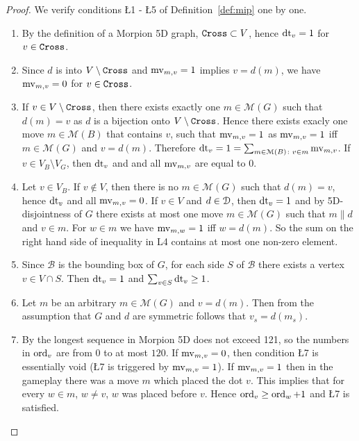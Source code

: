 \begin{proof}
  We verify conditions \L{1} - \L{5} of Definition~\ref{def:mip} one by one.
    
  \begin{enumerate}[label=\L{\arabic*}.]
   \item  By the definition of a Morpion 5D graph, $\texttt{Cross} \subset V$, hence $\operatorname{dt}_v = 1$ for $v \in \texttt{Cross}$.
  \item Since $d$ is into $V \setminus \texttt{Cross}$ and $\operatorname{mv}_{m, v} = 1$ implies $v = d(m)$, we have
    $\operatorname{mv}_{m, v} = 0$ for $v \in \texttt{Cross}$.
  \item If $v \in V \setminus \texttt{Cross}$, then there exists exactly one $m \in \mathcal{M}(G)$ such that $d(m) = v$
     as $d$ is a bijection onto $V \setminus \texttt{Cross}$.
   Hence  there exists exacly one move $m \in \mathcal{M}(B)$ that contains $v$,
     such that $\operatorname{mv}_{m, v} = 1$ as $\operatorname{mv}_{m,v} = 1$ iff $m \in \mathcal{M}(G)$ and $v = d(m)$.
   Therefore $\operatorname{dt}_v = 1 = \sum_{m \in \mathcal{M}(B) \colon v \in m} \operatorname{mv}_{m,v}$.
  If $v \in V_B \setminus V_G$, then $\operatorname{dt}_v$ and and all $\operatorname{mv}_{m, v}$ are equal to $0$. 
  \item Let $v \in V_B$. If $v \not\in V$, then there is no $m \in \mathcal{M}(G)$ such that
     $d(m) = v$, hence $\operatorname{dt}_v$ and all $\operatorname{mv}_{m,v} = 0$.
     If $v \in V$ and $d \in \mathcal{D}$, then $\operatorname{dt}_v = 1$ and by 5D-disjointness of $G$ there exists
    at most one move 
    $m \in \mathcal{M}(G)$ such that $m \parallel d$ and $v \in m$. 
    For $w \in m$ we have $\operatorname{mv}_{m, w} = 1$ iff $w = d(m)$.
    So the sum on the right hand side of inequality in L4 contains at most one non-zero element.
  \item Since $\mathcal{B}$ is the bounding box of $G$, for each side $S$ of $\mathcal{B}$ there
    exists a vertex $v \in V \cap S$. Then $\operatorname{dt}_v = 1$ and $\sum_{v \in S} \operatorname{dt}_v \geq 1$.  
  \item Let $m$ be an arbitrary $m\in \mathcal{M}(G)$ and $v=d(m)$. Then from the assumption that $G$ and $d$ are symmetric follows
that $v_s=d(m_s)$.
  \item  By \cite{japonczycy} the longest sequence in Morpion 5D does
not exceed 121, so the numbers in $\operatorname{ord}_v$ are from $0$ to at most $120$. If $\operatorname{mv}_{m, v} = 0$, then condition \L{7} is essentially void (\L{7} is triggered by $\operatorname{mv}_{m,v} = 1$).
 If $\operatorname{mv}_{m, v} = 1$ then in the gameplay there was a move $m$ which placed the dot $v$. This implies that for every $w\in m$, $w\neq v$, $w$ was placed before $v$. Hence
$\operatorname{ord}_v \geq \operatorname{ord}_w+1$ and \L{7} is satisfied. 
  \end{enumerate}
\end{proof}
